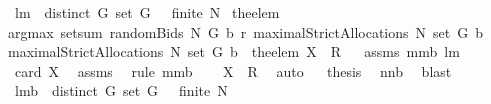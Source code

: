\begin{isabellebody}
\isanewline
{}\isamarkupfalse%
\ lm{}{}{\isacharcolon}\ \ {\isachardoublequoteopen}distinct\ G{\isachardoublequoteclose}\ {\isachardoublequoteopen}set\ G\ {\isasymnoteq}\ {\isacharbraceleft}{\isacharbraceright}{\isachardoublequoteclose}\ {\isachardoublequoteopen}finite\ N{\isachardoublequoteclose}\ \isanewline
{\isachardoublequoteopen}the{\isacharunderscore}elem\isanewline
{\isacharparenleft}argmax\ {\isacharparenleft}setsum\ {\isacharparenleft}randomBids{\isacharprime}\ N\ G\ b\ r{\isacharparenright}{\isacharparenright}\ {\isacharparenleft}maximalStrictAllocations{\isacharprime}\ N\ {\isacharparenleft}set\ G{\isacharparenright}\ b{\isacharparenright}{\isacharparenright}\ {\isasymin}\isanewline
{\isacharparenleft}maximalStrictAllocations{\isacharprime}\ N\ {\isacharparenleft}set\ G{\isacharparenright}\ b{\isacharparenright}{\isachardoublequoteclose}\ {\isacharparenleft}\ {\isachardoublequoteopen}the{\isacharunderscore}elem\ {\isacharquery}X\ {\isasymin}\ {\isacharquery}R{\isachardoublequoteclose}{\isacharparenright}%
\isadelimproof
\ %
\endisadelimproof
%
\isatagproof
{}\isamarkupfalse%
\ assms\ mm{}{}b\ lm{}{}\isanewline
{}\isamarkupfalse%
\ {\isacharminus}\isanewline
{}\isamarkupfalse%
\ {\isachardoublequoteopen}card\ {\isacharquery}X{\isacharequal}{}{\isachardoublequoteclose}\ \isamarkupfalse%
\ assms\ \isamarkupfalse%
\ {\isacharparenleft}rule\ mm{}{}b{\isacharparenright}\ \isamarkupfalse%
\ \isamarkupfalse%
\ {\isachardoublequoteopen}{\isacharquery}X\ {\isasymsubseteq}\ {\isacharquery}R{\isachardoublequoteclose}\ \isamarkupfalse%
\ auto\isanewline
{}\isamarkupfalse%
\ \isamarkupfalse%
\ {\isacharquery}thesis\ \isamarkupfalse%
\ nn{}{}b\ \isamarkupfalse%
\ blast\isanewline
{}\isamarkupfalse%
%
\endisatagproof
{\isafoldproof}%
%
\isadelimproof
%
\endisadelimproof
\isanewline
\isanewline
{}\isamarkupfalse%
\ lm{}{}b{\isacharcolon}\ \ {\isachardoublequoteopen}distinct\ G{\isachardoublequoteclose}\ {\isachardoublequoteopen}set\ G\ {\isasymnoteq}\ {\isacharbraceleft}{\isacharbraceright}{\isachardoublequoteclose}\ {\isachardoublequoteopen}finite\ N{\isachardoublequoteclose}\ \ \isanewline

\end{isabellebody}

